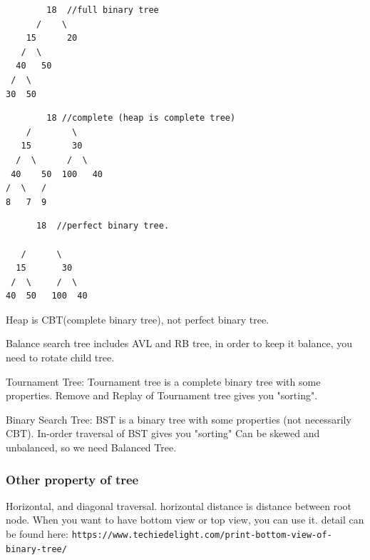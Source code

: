 \documentclass[a4paper,11pt,twoside]{book}
\begin{document}
\begin{minipage}{.5\textwidth}	
\begin{verbatim}
        18  //full binary tree
      /    \   
    15      20    
   /  \       
  40   50   
 /  \
30  50
\end{verbatim}
\end{minipage}
\begin{minipage}{.5\textwidth}	
\begin{verbatim}	
        18 //complete (heap is complete tree)   
    /        \  
   15        30  
  /  \      /  \
 40    50  100   40
/  \   /
8   7  9 
\end{verbatim}
\end{minipage}
	
\begin{verbatim}	
      18  //perfect binary tree.
      
   /      \  
  15       30  
 /  \     /  \
40  50   100  40
\end{verbatim}


	\par Heap is CBT(complete binary tree), not perfect binary tree. 

	\par Balance search tree includes AVL and RB tree, in order to keep it balance, you need to rotate child tree. 

	\par Tournament Tree: Tournament tree is a complete binary tree with some properties. Remove and  Replay of Tournament tree gives you "sorting". 

	\par Binary Search Tree: BST is a binary tree with some properties (not necessarily CBT). In-order traversal of BST gives you "sorting" Can be skewed and unbalanced, so we need Balanced Tree.


\subsubsection{Other property of tree}

	\par Horizontal, and diagonal traversal. horizontal distance is distance between root node. When you want to have bottom view or top view, you can use it.  detail can be found here: \newline
	\verb|https://www.techiedelight.com/print-bottom-view-of-binary-tree/|
	
\end{document}
